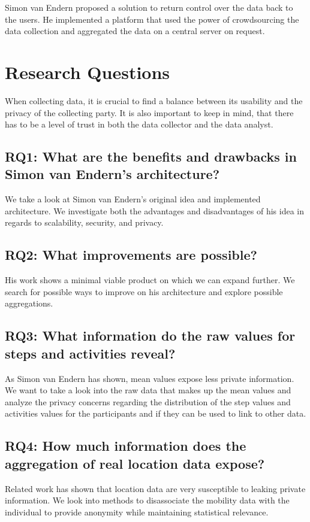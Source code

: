 Simon van Endern proposed a solution to return control over the data back to the users. He implemented a platform that used the power of crowdsourcing the data collection and aggregated the data on a central server on request.

\section{Research Questions}
When collecting data, it is crucial to find a balance between its usability and the privacy of the collecting party. It is also important to keep in mind, that there has to be a level of trust in both the data collector and the data analyst.
\subsection*{RQ1: What are the benefits and drawbacks in Simon van Endern's architecture?}
We take a look at Simon van Endern's original idea and implemented architecture. We investigate both the advantages and disadvantages of his idea in regards to scalability, security, and privacy.
\subsection*{RQ2: What improvements are possible?}
His work shows a minimal viable product on which we can expand further. We search for possible ways to improve on his architecture and explore possible aggregations.
\subsection*{RQ3: What information do the raw values for steps and activities reveal?}
As Simon van Endern has shown, mean values expose less private information. We want to take a look into the raw data that makes up the mean values and analyze the privacy concerns regarding the distribution of the step values and activities values for the participants and if they can  be used to link to other data.
\subsection*{RQ4: How much information does the aggregation of real location data expose?}
Related work has shown that location data are very susceptible to leaking private information. We look into methods to disassociate the mobility data with the individual to provide anonymity while maintaining statistical relevance.
